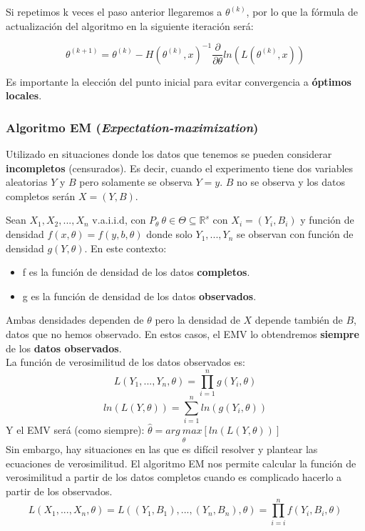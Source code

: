 Si repetimos k veces el paso anterior llegaremos a $\theta^{(k)}$, por lo que la fórmula de actualización del algoritmo en la siguiente iteración será:

$$\theta^{(k+1)}=\theta^{(k)}-H(\theta^{(k)},x)^{-1}\frac{\partial}{\partial\theta}ln(L(\theta^{(k)},x))$$

Es importante la elección del punto inicial para evitar convergencia a \textbf{óptimos locales}.

\subsubsection{Algoritmo EM (\textit{Expectation-maximization})}

Utilizado en situaciones donde los datos que tenemos se pueden considerar \textbf{incompletos} (censurados). 
Es decir, cuando el experimento tiene dos variables aleatorias $Y$ y $B$ pero solamente se observa $Y=y$. $B$ no se observa y los datos completos serán $X=(Y,B)$. 

Sean $X_1, X_2,...,X_n$ v.a.i.i.d, con $P_\theta\ \theta\in\Theta\subseteq \mathbb{R}^s$ con $X_i=(Y_i,B_i)$ y función de densidad $f(x,\theta)=f(y,b,\theta)$ donde solo $Y_1,...,Y_n$ se observan con función de densidad $g(Y,\theta)$.
En este contexto:
\begin{itemize}
    \item f es la función de densidad de los datos \textbf{completos}.
    \item g es la función de densidad de los datos \textbf{observados}.
\end{itemize}
Ambas densidades dependen de $\theta$ pero la densidad de $X$ depende también de $B$, datos que no hemos observado. En estos casos, el EMV lo obtendremos \textbf{siempre} de los \textbf{datos observados}.
\\

La función de verosimilitud de los datos observados es:
$$L(Y_1,...,Y_n,\theta)= \prod_{i=1}^{n}g(Y_i,\theta)$$ $$ln(L(Y,\theta))=\sum_{i=1}^{n}ln(g(Y_i,\theta))$$ Y el EMV será (como siempre): $\widehat\theta=\underset{\theta}{arg\ max}[ln(L(Y,\theta))]$
\\

Sin embargo, hay situaciones en las que es difícil resolver y plantear las ecuaciones de verosimilitud. El algoritmo EM nos permite calcular la función de verosimilitud a partir de los datos completos cuando es complicado hacerlo a partir de los observados.
$$L(X_1,...,X_n,\theta)=L((Y_1,B_1),...,(Y_n,B_n),\theta)=\prod_{i=i}^{n}f(Y_i,B_i,\theta)$$

